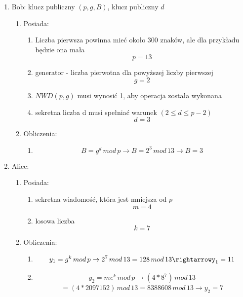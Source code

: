 \documentclass[12pt,a4paper]{article}
\begin{document}
\begin{enumerate}
    \item Bob: klucz publiczny $(p, g, B)$, klucz publiczny $d$
    \begin{enumerate}
        \item Posiada:
    
        \begin{enumerate}
            \item Liczba pierwsza powinna mieć około 300 znaków, ale dla przykładu będzie ona mała \[p=13\]
            \item generator - liczba pierwotna dla powyższej liczby pierwszej\[g = 2\]
            \item $NWD(p,g)$ musi wynosić 1, aby operacja została wykonana
            \item sekretna liczba d musi spełniać warunek $(2\leq d\leq p-2)$ \[d=3\]
        \end{enumerate}
        \item Obliczenia:
        \begin{enumerate}
            \item \[B=g^{d}\,mod\, p \rightarrow B=2^{3}\,mod\,13 \rightarrow B=3\]
        \end{enumerate}
    
    \end{enumerate}
    \item Alice:
    \begin{enumerate}
        \item Posiada:
        \begin{enumerate}
            \item sekretna wiadomość, która jest mniejsza od $p$ \[m=4\]
            \item losowa liczba \[k=7\]
        \end{enumerate}
        \item Obliczenia:
        \begin{enumerate}
            \item \begin{gather}
                y_{1}=g^{k}\,mod\, p \rightarrow 2^{7}\,mod\,13=128\,mod\,13\rightarrowy_{1}=11
            \end{gather} 
            \item \begin{gather}
                y_{2}=me^{k}\,mod\, p\rightarrow(4*8^{7})\,mod\,13 \end{gather}
               \[ =(4*2097152)\,mod\,13=8388608\,mod\,13\rightarrow y_{2}=7\]
            

\end{enumerate}
\end{enumerate}
\end{enumerate}
\end{document}
